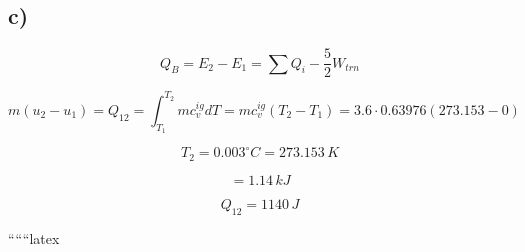 

\subsection*{c)}
\[
Q_B = E_2 - E_1 = \sum Q_i - \frac{5}{2} W_{trn}
\]

\[
m (u_2 - u_1) = Q_{12} = \int_{T_1}^{T_2} m c_v^{ig} dT = m c_v^{ig} (T_2 - T_1) = 3.6 \cdot 0.63976 (273.153 - 0)
\]

\[
T_2 = 0.003^\circ C = 273.153 \, K
\]

\[
= 1.14 \, kJ
\]

\[
Q_{12} = 1140 \, J
\]

``````latex